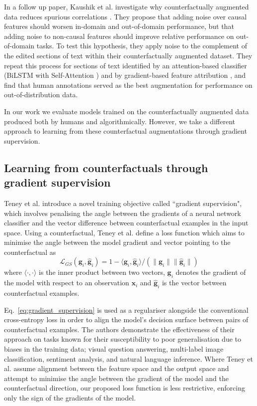 In a follow up paper, Kaushik et al. investigate why counterfactually augmented data reduces spurious correlations \cite{kaushik2021explaining}. They propose that adding noise over causal features should worsen in-domain and out-of-domain performance, but that adding noise to non-causal features should improve relative performance on out-of-domain tasks. To test this hypothesis, they apply noise to the complement of the edited sections of text within their counterfactually augmented dataset. They repeat this process for sections of text identified by an attention-based classifier (BiLSTM with Self-Attention \cite{graves2005framewise}) and by gradient-based feature attribution \cite{li2016visualizing}, and find that human annotations served as the best augmentation for performance on out-of-distribution data. 

In our work we evaluate models trained on the counterfactually augmented data produced both by humans and algorithmically. However, we take a different approach to learning from these counterfactual augmentations through gradient supervision.

\subsection{Learning from counterfactuals through gradient supervision}
\label{subsec:gradient_supervision}
Teney et al. \cite{teney2020learning} introduce a novel training objective called ``gradient supervision", which involves penalising the angle between the gradients of a neural network classifier and the vector difference between counterfactual examples in the input space. Using a counterfactual, Teney et al. define a loss function which aims to minimise the angle between the model gradient and vector pointing to the counterfactual as 
\begin{equation}
        \mathcal{L}_{GS} \left(\mathbf{g}_i,\hat{\mathbf{g}}_i \right)  = 
        1 - \langle\mathbf{g}_i,\hat{\mathbf{g}}_i \rangle /
        \left( \lVert \mathbf{g}_i \rVert \lVert \hat{\mathbf{g}}_i \rVert \right)
        \label{eq:gradient_supervision}
\end{equation}
where $\langle \cdot, \cdot \rangle$ is the inner product between two vectors, $\mathbf{g}_i$ denotes the gradient of the model with respect to an observation $\mathbf{x}_i$ and $\hat{\mathbf{g}}_i$ is the vector between counterfactual examples.

Eq.~\ref{eq:gradient_supervision} is used as a regulariser alongside the conventional cross-entropy loss in order to align the model's decision surface between pairs of counterfactual examples. The authors demonstrate the effectiveness of their approach on tasks known for their susceptibility to poor generalisation due to biases in the training data; visual question answering, multi-label image classification, sentiment analysis, and natural language inference. Where Teney et al. assume alignment between the feature space and the output space and attempt to minimise the angle between the gradient of the model and the counterfactual direction, our proposed loss function is less restrictive, enforcing only the sign of the gradients of the model.

